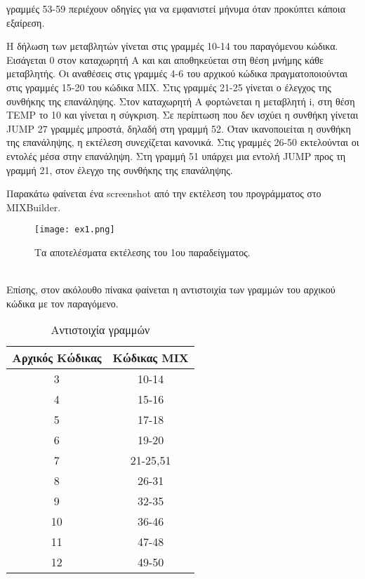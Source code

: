\documentclass[12pt,a4paper]{report}
\begin{document}
γραμμές 53-59 περιέχουν οδηγίες για να εμφανιστεί μήνυμα 
όταν προκύπτει κάποια εξαίρεση. \par
Η δήλωση των μεταβλητών γίνεται στις γραμμές 10-14 του 
παραγόμενου κώδικα. Εισάγεται 0 στον καταχωρητή Α και 
και αποθηκεύεται στη θέση μνήμης κάθε μεταβλητής. Οι αναθέσεις
στις γραμμές 4-6 του αρχικού κώδικα πραγματοποιούνται στις 
γραμμές 15-20 του κώδικα MIX. Στις γραμμές 21-25 γίνεται 
ο έλεγχος της συνθήκης της επανάληψης. Στον καταχωρητή Α φορτώνεται η 
μεταβλητή i, στη θέση TEMP το 10 και γίνεται η σύγκριση. Σε περίπτωση 
που δεν ισχύει η συνθήκη γίνεται JUMP 27 γραμμές μπροστά, δηλαδή στη 
γραμμή 52. Όταν ικανοποιείται η συνθήκη της επανάληψης, η εκτέλεση 
συνεχίζεται κανονικά. Στις γραμμές 26-50 εκτελούνται οι εντολές μέσα 
στην επανάληψη. Στη γραμμή 51 υπάρχει μια εντολή JUMP προς τη γραμμή 21, 
στον έλεγχο της συνθήκης της επανάληψης.
\par
Παρακάτω φαίνεται ένα screenshot από την εκτέλεση του προγράμματος στο 
MIXBuilder.
\begin{figure}[h]
    \texttt{[image: ex1.png]}
    \caption{Τα αποτελέσματα εκτέλεσης του 1ου παραδείγματος.}
\end{figure}
\\
Επίσης, στον ακόλουθο πίνακα φαίνεται η αντιστοιχία των γραμμών του αρχικού 
κώδικα με τον παραγόμενο.
\begin{table}[h]
    \centering
    \begin{tabular}{|c|c|}
    \hline
    Αρχικός Κώδικας & Κώδικας MIX \\ \hline
    3               & 10-14       \\ \hline
    4               & 15-16       \\ \hline
    5               & 17-18       \\ \hline
    6               & 19-20       \\ \hline
    7               & 21-25,51    \\ \hline
    8               & 26-31       \\ \hline
    9               & 32-35       \\ \hline
    10              & 36-46       \\ \hline
    11              & 47-48       \\ \hline
    12              & 49-50       \\ \hline
    \end{tabular}
    \caption{Αντιστοιχία γραμμών}
    \label{tab:my-table}
    \end{table}
\end{document}
